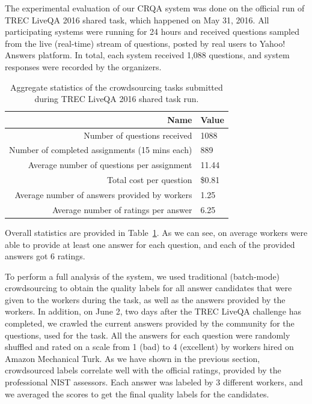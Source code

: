The experimental evaluation of our CRQA system was done on the official run of TREC LiveQA 2016 shared task, which happened on May 31, 2016.
All participating systems were running for 24 hours and received questions sampled from the live (real-time) stream of questions, posted by real users to Yahoo! Answers platform.
In total, each system received 1,088 questions, and system responses were recorded by the organizers.

\begin{table}[ht]
\centering
\begin{tabular}{r|l}
Name & Value \\
\hline
Number of questions received & 1088 \\
Number of completed assignments (15 mins each) & 889 \\
Average number of questions per assignment & 11.44 \\
Total cost per question & \$0.81 \\
Average number of answers provided by workers & 1.25 \\
Average number of ratings per answer & 6.25 \\
\end{tabular}
\caption{Aggregate statistics of the crowdsourcing tasks submitted during TREC LiveQA 2016 shared task run.}
\label{table:non-factoid:crowdsourcing:crqa:task_stats}
\end{table}

Overall statistics are provided in Table~\ref{table:non-factoid:crowdsourcing:crqa:task_stats}.
As we can see, on average workers were able to provide at least one answer for each question, and each of the provided answers got 6 ratings.

To perform a full analysis of the system, we used traditional (batch-mode) crowdsourcing to obtain the quality labels for all answer candidates that were given to the workers during the task, as well as the answers provided by the workers.
In addition, on June 2, two days after the TREC LiveQA challenge has completed, we crawled the current answers provided by the community for the questions, used for the task.
All the answers for each question were randomly shuffled and rated on a scale from 1 (bad) to 4 (excellent) by workers hired on Amazon Mechanical Turk.
As we have shown in the previous section, crowdsourced labels correlate well with the official ratings, provided by the professional NIST assessors.
Each answer was labeled by 3 different workers, and we averaged the scores to get the final quality labels for the candidates.

